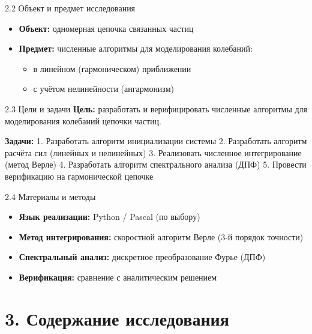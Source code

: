 \documentclass[
  ignorenonframetext,
  aspectratio=169,
  russian,
]{beamer}
\providecommand{\tightlist}{%
  \setlength{\itemsep}{0pt}\setlength{\parskip}{0pt}}\usepackage{longtable,booktabs,array}
\begin{document}
\begin{frame}{2.2 Объект и предмет исследования}
\label{ux43eux431ux44aux435ux43aux442-ux438-ux43fux440ux435ux434ux43cux435ux442-ux438ux441ux441ux43bux435ux434ux43eux432ux430ux43dux438ux44f}
\begin{itemize}[<+->]
\tightlist
\item
  \textbf{Объект:} одномерная цепочка связанных частиц
\item
  \textbf{Предмет:} численные алгоритмы для моделирования колебаний:

  \begin{itemize}[<+->]
  \tightlist
  \item
    в линейном (гармоническом) приближении
  \item
    с учётом нелинейности (ангармонизм)
  \end{itemize}
\end{itemize}
\end{frame}

\begin{frame}{2.3 Цели и задачи}
\label{ux446ux435ux43bux438-ux438-ux437ux430ux434ux430ux447ux438}
\textbf{Цель:} разработать и верифицировать численные алгоритмы для
моделирования колебаний цепочки частиц.

\textbf{Задачи:} 1. Разработать алгоритм инициализации системы 2.
Разработать алгоритм расчёта сил (линейных и нелинейных) 3. Реализовать
численное интегрирование (метод Верле) 4. Разработать алгоритм
спектрального анализа (ДПФ) 5. Провести верификацию на гармонической
цепочке
\end{frame}

\begin{frame}{2.4 Материалы и методы}
\label{ux43cux430ux442ux435ux440ux438ux430ux43bux44b-ux438-ux43cux435ux442ux43eux434ux44b}
\begin{itemize}[<+->]
\tightlist
\item
  \textbf{Язык реализации:} Python / Pascal (по выбору)
\item
  \textbf{Метод интегрирования:} скоростной алгоритм Верле (3-й порядок
  точности)
\item
  \textbf{Спектральный анализ:} дискретное преобразование Фурье (ДПФ)
\item
  \textbf{Верификация:} сравнение с аналитическим решением
\end{itemize}
\end{frame}

\section{3. Содержание
исследования}\label{ux441ux43eux434ux435ux440ux436ux430ux43dux438ux435-ux438ux441ux441ux43bux435ux434ux43eux432ux430ux43dux438ux44f}
\end{document}
